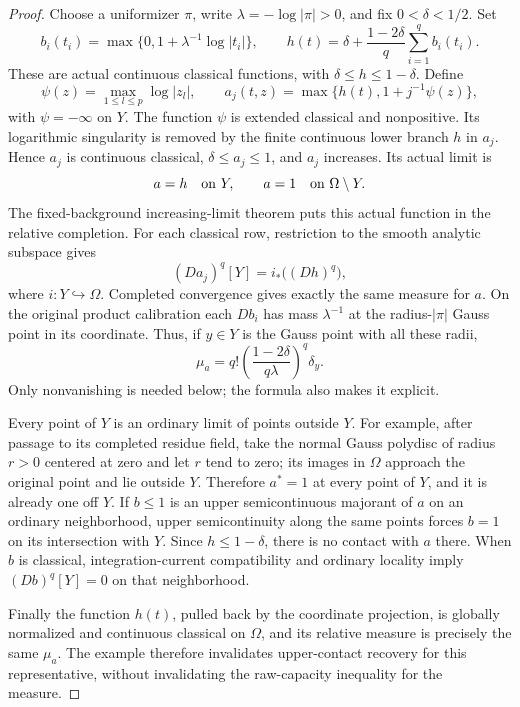 \documentclass[11pt,a4paper]{article}
\numberwithin{equation}{section}
\theoremstyle{definition}
\theoremstyle{remark}
\begin{document}
\begin{proof}
Choose a uniformizer $\pi$, write $\lambda=-\log|\pi|>0$, and fix
$0<\delta<1/2$. Set
\[
 b_i(t_i)=\max\{0,1+\lambda^{-1}\log|t_i|\},\qquad
 h(t)=\delta+\frac{1-2\delta}{q}\sum_{i=1}^q b_i(t_i).
\]
These are actual continuous classical functions, with
$\delta\leq h\leq1-\delta$. Define
\[
 \psi(z)=\max_{1\leq l\leq p}\log|z_l|,\qquad
 a_j(t,z)=\max\{h(t),1+j^{-1}\psi(z)\},
\]
with $\psi=-\infty$ on $Y$. The function $\psi$ is extended classical
and nonpositive. Its logarithmic singularity is removed by the finite
continuous lower branch $h$ in $a_j$. Hence $a_j$ is continuous
classical, $\delta\leq a_j\leq1$, and $a_j$ increases. Its actual limit is
\[
                a=h\quad\hbox{on }Y,\qquad
                a=1\quad\hbox{on }\Omega\setminus Y.
\]
The fixed-background increasing-limit theorem puts this actual function
in the relative completion. For each classical row, restriction to the
smooth analytic subspace gives
\[
               (Da_j)^q[Y]=i_*\bigl((Dh)^q\bigr),
\]
where $i:Y\hookrightarrow\Omega$. Completed convergence gives exactly
the same measure for $a$. On the original product calibration each
$Db_i$ has mass $\lambda^{-1}$ at the radius-$|\pi|$ Gauss point in its
coordinate. Thus, if $y\in Y$ is the Gauss point with all these radii,
\[
       \mu_a=q!\left(\frac{1-2\delta}{q\lambda}\right)^q\delta_y.
\]
Only nonvanishing is needed below; the formula also makes it explicit.

Every point of $Y$ is an ordinary limit of points outside $Y$.
For example, after passage to its completed residue field, take the
normal Gauss polydisc of radius $r>0$ centered at zero and let $r$ tend
to zero; its images in $\Omega$ approach the original point and lie
outside $Y$. Therefore $a^*=1$ at every point of $Y$, and it is already
one off $Y$. If $b\leq1$ is an upper semicontinuous majorant of $a$
on an ordinary neighborhood, upper semicontinuity along the same points
forces $b=1$ on its intersection with $Y$. Since $h\leq1-\delta$,
there is no contact with $a$ there. When $b$ is classical,
integration-current compatibility and ordinary locality imply
$(Db)^q[Y]=0$ on that neighborhood.

Finally the function $h(t)$, pulled back by the coordinate projection,
is globally normalized and continuous classical on $\Omega$, and its
relative measure is precisely the same $\mu_a$. The example therefore
invalidates upper-contact recovery for this representative, without
invalidating the raw-capacity inequality for the measure.
\end{proof}
\end{document}
